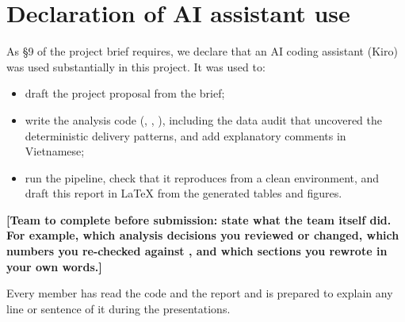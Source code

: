 \section{Declaration of AI assistant use}
\label{app:ai}

As §9 of the project brief requires, we declare that an AI coding assistant (Kiro) was used
substantially in this project. It was used to:
\begin{itemize}
  \item draft the project proposal from the brief;
  \item write the analysis code (, , ), including
        the data audit that uncovered the deterministic delivery patterns, and add explanatory
        comments in Vietnamese;
  \item run the pipeline, check that it reproduces from a clean environment, and draft this
        report in \LaTeX{} from the generated tables and figures.
\end{itemize}
\textbf{[Team to complete before submission: state what the team itself did. For example,
which analysis decisions you reviewed or changed, which numbers you re-checked against
, and which sections you rewrote in your own words.]}

Every member has read the code and the report and is prepared to explain any line or
sentence of it during the presentations.
